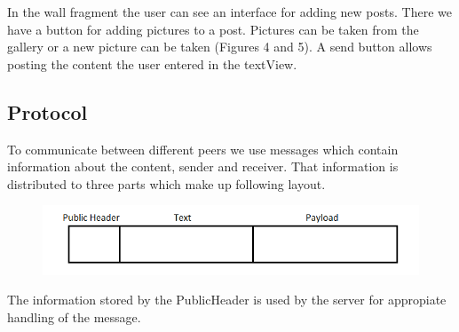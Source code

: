 \documentclass{report}
\newcommand{\lfig}[1]{\label{fig:#1}}
\begin{document}
In the wall fragment the user can see an interface for adding new posts. There we have a button for adding pictures to a post. Pictures can be taken from the gallery or a new picture can be taken (Figures 4 and 5). A send button allows posting the content the user entered in the textView. \begin{figure}[H]
	\centering
	\hfill
	\hfill
	
\end{figure}

\subsection{Protocol}

To communicate between different peers we use messages which contain information about the content, sender and receiver. That information is distributed to three parts which make up following layout.
\begin{figure}[H]

	\centering
    \includegraphics[width=\columnwidth]{Layout.png}
    \lfig{Layout}
    \vspace{-5mm} %
\end{figure}
The information stored by the PublicHeader is used by the server for appropiate handling of the message.  
\end{document}

